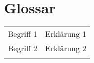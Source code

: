 \chapter{Glossar}
\begin{table}[H]
\centering
\begin{tabular}{@{} p{5cm} p{10cm}}    
Begriff 1 &   Erklärung 1 \\ \addlinespace
Begriff 2 &  Erklärung 2  \\ \addlinespace
\end{tabular}
\end{table} 